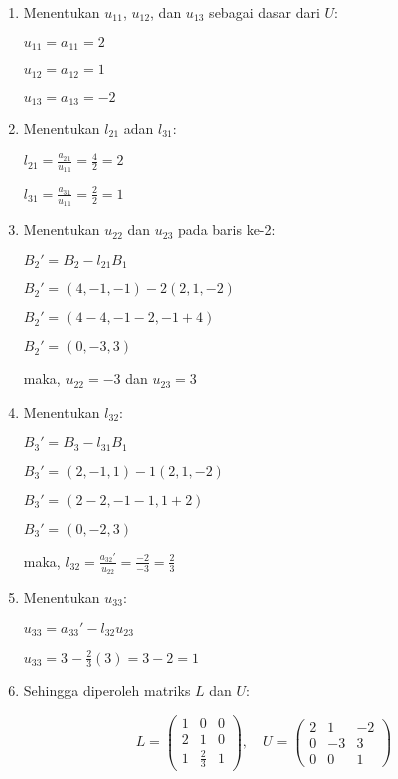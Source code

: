 \documentclass{article}
\begin{document}
\begin{enumerate}
    \item Menentukan \(u_{11}\), \(u_{12}\), dan \(u_{13}\) sebagai dasar dari \(U\):
  
    \(u_{11} = a_{11} = 2\)

    \(u_{12} = a_{12} = 1\)

    \(u_{13} = a_{13} = -2\)


    \item Menentukan \(l_{21}\) adan \(l_{31}\):

    \(l_{21} = \frac{a_{21}}{u_{11}} = \frac{4}{2} = 2\)

    \(l_{31} = \frac{a_{31}}{u_{11}} = \frac{2}{2} = 1\)

    \item Menentukan \(u_{22}\) dan \(u_{23}\) pada baris ke-2:
    
    \(B_2' = B_2 - l_{21}B_1\)

    \(B_2' = (4, -1, -1) - 2(2, 1, -2) \)

    \(B_2' = (4 - 4, -1 - 2, -1 + 4)\)
    
    \(B_2' = (0, -3, 3)\)

    maka, \(u_{22} = -3\) dan \(u_{23} = 3\)

    \item Menentukan \(l_{32}\):
    
    \(B_3' = B_3 - l_{31}B_1\)

    \(B_3' = (2, -1, 1) - 1(2, 1, -2) \)

    \(B_3' = (2 - 2, -1 - 1, 1 + 2)\)

    \(B_3' = (0, -2, 3)\)

    maka, \(l_{32} = \frac{a_{32}'}{u_{22}} = \frac{-2}{-3} = \frac{2}{3}\)

    \item Menentukan \(u_{33}\):

    \(u_{33} = a_{33}' - l_{32}u_{23}\)

    \(u_{33} = 3 - \frac{2}{3}(3) = 3 - 2 = 1\)

    \item Sehingga diperoleh matriks \(L\) dan \(U\):

    \[
    L =
    \begin{pmatrix}
    1 & 0 & 0 \\
    2 & 1 & 0 \\
    1 & \frac{2}{3} & 1
    \end{pmatrix},
    \quad
    U =
    \begin{pmatrix}
    2 & 1 & -2 \\
    0 & -3 & 3 \\
    0 & 0 & 1
    \end{pmatrix}
    \]
\end{enumerate}
\end{document}
